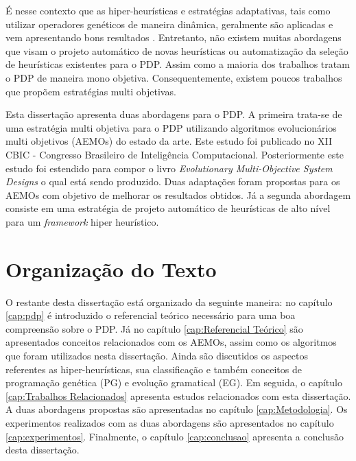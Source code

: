 É nesse contexto que as hiper-heurísticas e estratégias adaptativas, tais como utilizar operadores genéticos de maneira dinâmica, geralmente são aplicadas e vem apresentando bons resultados \cite{burke2013hyper}. Entretanto, não existem muitas abordagens que visam o projeto automático de novas heurísticas ou automatização da seleção de heurísticas existentes para o PDP. Assim como a maioria dos trabalhos tratam o PDP de maneira mono objetiva. Consequentemente, existem poucos trabalhos que propõem estratégias multi objetivas.

Esta dissertação apresenta duas abordagens para o PDP. A primeira trata-se de uma estratégia multi objetiva para o PDP utilizando algoritmos evolucionários multi objetivos (AEMOs) do estado da arte. Este estudo \cite{fontouralimacbic2015} foi publicado no XII CBIC - Congresso Brasileiro de Inteligência Computacional. Posteriormente este estudo foi estendido para compor o livro \textit{Evolutionary Multi-Objective System Designs} o qual está sendo produzido. Duas adaptações foram propostas para os AEMOs com objetivo de melhorar os resultados obtidos. Já a segunda abordagem consiste em uma estratégia de projeto automático de heurísticas de alto nível para um \textit{framework} hiper heurístico.




\section{Organização do Texto}
\label{Introducao:Organizacao do Texto}

O restante desta dissertação está organizado da seguinte maneira: no capítulo \ref{cap:pdp} é introduzido o referencial teórico necessário para uma boa compreensão sobre o PDP. Já no capítulo \ref{cap:Referencial Teórico} são apresentados conceitos relacionados com os AEMOs, assim como os algoritmos que foram utilizados nesta dissertação. Ainda são discutidos os aspectos referentes as hiper-heurísticas, sua classificação e também conceitos de programação genética (PG) e evolução gramatical (EG). Em seguida, o capítulo \ref{cap:Trabalhos Relacionados} apresenta estudos relacionados com esta dissertação. A duas abordagens propostas são apresentadas no capítulo \ref{cap:Metodologia}. Os experimentos realizados com as duas abordagens são apresentados no capítulo \ref{cap:experimentos}. Finalmente, o capítulo \ref{cap:conclusao} apresenta a conclusão desta dissertação.







 